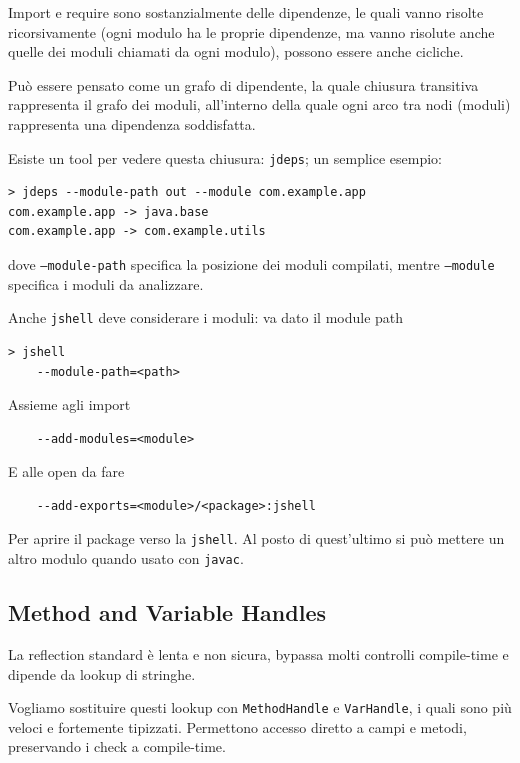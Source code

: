 
Import e require sono sostanzialmente delle dipendenze, le quali vanno risolte ricorsivamente (ogni modulo ha le proprie dipendenze, ma vanno risolute anche quelle dei moduli chiamati da ogni modulo), possono essere anche cicliche.

Può essere pensato come un grafo di dipendente, la quale chiusura transitiva rappresenta il grafo dei moduli, all'interno della quale ogni arco tra nodi (moduli) rappresenta una dipendenza soddisfatta.

Esiste un tool per vedere questa chiusura: \texttt{jdeps}; un semplice esempio:
\begin{verbatim}
> jdeps --module-path out --module com.example.app
com.example.app -> java.base
com.example.app -> com.example.utils
\end{verbatim}
dove \texttt{--module-path} specifica la posizione dei moduli compilati, mentre \texttt{--module} specifica i moduli da analizzare.

Anche \texttt{jshell} deve considerare i moduli: va dato il module path
\begin{verbatim}
> jshell
    --module-path=<path>
\end{verbatim}
Assieme agli import
\begin{verbatim}
    --add-modules=<module>
\end{verbatim}
E alle open da fare
\begin{verbatim}
    --add-exports=<module>/<package>:jshell
\end{verbatim}
Per aprire il package verso la \texttt{jshell}. Al posto di quest'ultimo si può mettere un altro modulo quando usato con \texttt{javac}.

\subsection{Method and Variable Handles}

La reflection standard è lenta e non sicura, bypassa molti controlli compile-time e dipende da lookup di stringhe.

Vogliamo sostituire questi lookup con \texttt{MethodHandle} e \texttt{VarHandle}, i quali sono più veloci e fortemente tipizzati. Permettono accesso diretto a campi e metodi, preservando i check a compile-time.

